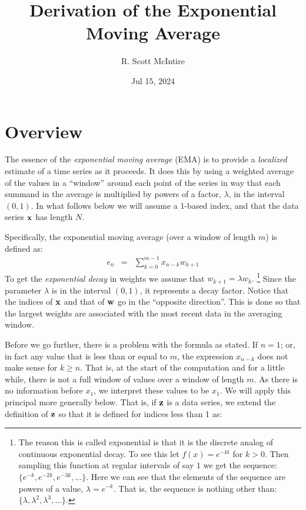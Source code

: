 \documentclass{article}
\title{Derivation of the Exponential Moving Average}
\author{R. Scott McIntire}
\date{Jul 15, 2024}
\begin{document}

\maketitle

\section{Overview}

The essence of the {\em exponential moving average\/} (EMA) is to provide 
a {\em localized\/} estimate of a time series as it proceeds. It does 
this by using a weighted average of the values in a ``window'' around each point 
of the series in way that each summand in 
the average is multiplied by powers of a factor, $\lambda$,
in the interval $(0,1)$.
In what follows below we will assume a 1-based index, and that 
the data series ${\bf x}$ has length $N$.

Specifically, the exponential moving average (over a window of length $m$) 
is defined as:
\begin{eqnarray}
    e_n &=& \sum_{k=0}^{m-1} x_{n-k} w_{k+1}  \label{ema_def}
\end{eqnarray}
To get the {\em exponential decay\/} in weights we assume that $w_{k+1} = \lambda w_k$.%
\footnote{The reason this is called exponential is that it is the discrete
analog of continuous exponential decay. To see this let $f(x) = e^{-kt}$ 
for $k > 0$. Then sampling this function at regular intervals of say $1$ 
we get the sequence: $\{ e^{-k}, e^{-2k}, e^{-3k}, \ldots \}$.
Here we can see that the elements of the sequence are powers of a value, $\lambda = e^{-k}$.
That is, the sequence is nothing other than: $\{\lambda, \lambda^2, \lambda^3, \ldots \}$.}
Since the parameter $\lambda$ is in the interval $(0,1)$, it represents a decay factor. 
Notice that the indices of ${\bf x}$ and that of ${\bf w}$ go in the ``opposite direction''.
This is done so that the largest weights are associated with the most recent data
in the averaging window.

Before we go further, there is a problem with the formula as stated.
If $n = 1$; or, in fact any value that is less than or equal to $m$,
the expression $x_{n-k}$ does not make sense for $k \ge n$. That is, at the 
start of the computation and for a little while, there is not a full window
of values over a window of length $m$. As there is no information before $x_1$,
we interpret these values to be $x_1$. 
We will apply this principal more generally below. 
That is, if ${\bf z}$ is a data series,
we extend the definition of ${\bf z}$ so that it is defined for
indices less than 1 as:
\end{document}

